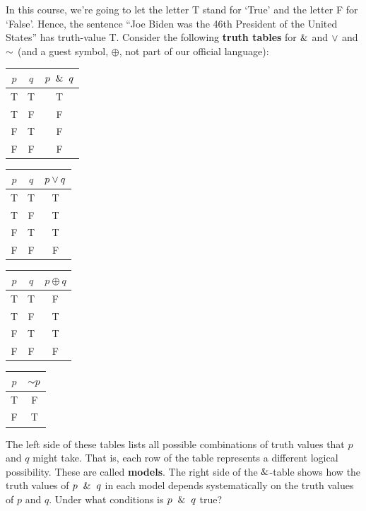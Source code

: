 \documentclass[options]{philosophersimprint}
\theoremstyle{definition}
\begin{document}
In this course, we're going to let the letter T stand for `True' and the letter F for `False'. Hence, the sentence ``Joe Biden was the 46th President of the United States'' has truth-value T. Consider the following \textbf{truth tables} for $\mathbin{\&}$ and $\mathbin{\vee}$ and $\mathord{\sim}$ (and a guest symbol, $\oplus$, not part of our official language):
\begin{table}[h!]
    \centering
    \begin{tabular}{c c| c}
        $p$ & $q$ & $p \ \mathbin{\&} \  q$ \\
        \hline
        T & T & T \\
        T & F & F\\
        F & T & F\\
        F & F & F\\
    \end{tabular}
    \hspace{.1cm}
    \begin{tabular}{c c| c}
        $p$ & $q$ & $p \mathbin{\vee} q$ \\
        \hline
        T & T & T \\
        T & F & T\\
        F & T & T\\
        F & F & F\\
    \end{tabular}
    \hspace{.1cm}
    \begin{tabular}{c c| c}
        $p$ & $q$ & $p \oplus q$ \\
        \hline
        T & T & F \\
        T & F & T\\
        F & T & T\\
        F & F & F\\
    \end{tabular}
    \hspace{.1cm}
    \begin{tabular}{c|c}
        $p$ & $\mathord{\sim} p$ \\
        \hline
        T & F\\
        F & T
    \end{tabular}
\end{table}

The left side of these tables lists all possible combinations of truth values that $p$ and $q$ might take. That is, each row of the table represents a different logical possibility. These are called \textbf{models}. The right side of the $\mathbin{\&}$-table shows how the truth values of $p \ \mathbin{\&} \  q$ in each model depends systematically on the truth values of $p$ and $q$. Under what conditions is $p\ \mathbin{\&} \  q$ true?
\end{document}
